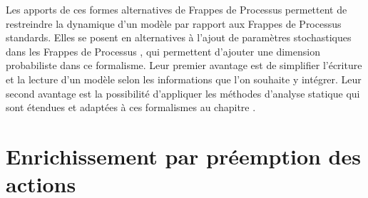 Les apports de ces formes alternatives de Frappes de Processus permettent de restreindre la dynamique
d'un modèle par rapport aux Frappes de Processus standards.
Elles se posent en alternatives à l'ajout de paramètres stochastiques dans les Frappes de Processus
,
qui permettent d'ajouter une dimension probabiliste dans ce formalisme.
Leur premier avantage est de simplifier l'écriture et la lecture d'un modèle selon les informations
que l'on souhaite y intégrer.
Leur second avantage est la possibilité d'appliquer les méthodes d'analyse statique
qui sont étendues et adaptées à ces formalismes au chapitre .



\section{Enrichissement par préemption des actions}
  
  




